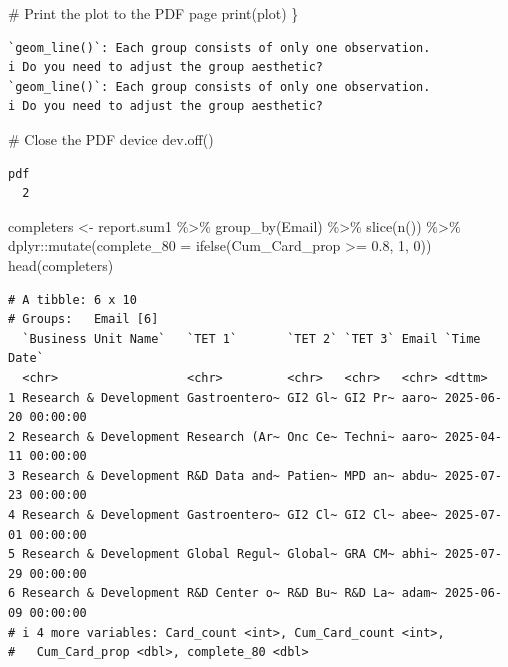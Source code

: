 \documentclass[
  letterpaper,
  DIV=11,
  numbers=noendperiod]{scrartcl}
\newenvironment{Shaded}{\begin{snugshade}}{\end{snugshade}}
\newcommand{\AttributeTok}[1]{\textcolor[rgb]{0.40,0.45,0.13}{#1}}
\newcommand{\CommentTok}[1]{\textcolor[rgb]{0.37,0.37,0.37}{#1}}
\newcommand{\DecValTok}[1]{\textcolor[rgb]{0.68,0.00,0.00}{#1}}
\newcommand{\FloatTok}[1]{\textcolor[rgb]{0.68,0.00,0.00}{#1}}
\newcommand{\FunctionTok}[1]{\textcolor[rgb]{0.28,0.35,0.67}{#1}}
\newcommand{\NormalTok}[1]{\textcolor[rgb]{0.00,0.23,0.31}{#1}}
\newcommand{\OtherTok}[1]{\textcolor[rgb]{0.00,0.23,0.31}{#1}}
\newcommand{\SpecialCharTok}[1]{\textcolor[rgb]{0.37,0.37,0.37}{#1}}
\begin{document}
\begin{Shaded}
\begin{Highlighting}[]
  \CommentTok{\# Print the plot to the PDF page}
  \FunctionTok{print}\NormalTok{(plot)}
\NormalTok{\}}
\end{Highlighting}
\end{Shaded}

\begin{verbatim}
`geom_line()`: Each group consists of only one observation.
i Do you need to adjust the group aesthetic?
`geom_line()`: Each group consists of only one observation.
i Do you need to adjust the group aesthetic?
\end{verbatim}

\begin{Shaded}
\begin{Highlighting}[]
\CommentTok{\# Close the PDF device}
\FunctionTok{dev.off}\NormalTok{()}
\end{Highlighting}
\end{Shaded}

\begin{verbatim}
pdf 
  2 
\end{verbatim}

\begin{Shaded}
\begin{Highlighting}[]
\NormalTok{completers }\OtherTok{\textless{}{-}}\NormalTok{ report.sum1 }\SpecialCharTok{\%\textgreater{}\%} \FunctionTok{group\_by}\NormalTok{(Email) }\SpecialCharTok{\%\textgreater{}\%} 
  \FunctionTok{slice}\NormalTok{(}\FunctionTok{n}\NormalTok{()) }\SpecialCharTok{\%\textgreater{}\%}
\NormalTok{  dplyr}\SpecialCharTok{::}\FunctionTok{mutate}\NormalTok{(}\AttributeTok{complete\_80 =} \FunctionTok{ifelse}\NormalTok{(Cum\_Card\_prop }\SpecialCharTok{\textgreater{}=} \FloatTok{0.8}\NormalTok{, }\DecValTok{1}\NormalTok{, }\DecValTok{0}\NormalTok{)) }
\FunctionTok{head}\NormalTok{(completers)}
\end{Highlighting}
\end{Shaded}

\begin{verbatim}
# A tibble: 6 x 10
# Groups:   Email [6]
  `Business Unit Name`   `TET 1`       `TET 2` `TET 3` Email `Time Date`        
  <chr>                  <chr>         <chr>   <chr>   <chr> <dttm>             
1 Research & Development Gastroentero~ GI2 Gl~ GI2 Pr~ aaro~ 2025-06-20 00:00:00
2 Research & Development Research (Ar~ Onc Ce~ Techni~ aaro~ 2025-04-11 00:00:00
3 Research & Development R&D Data and~ Patien~ MPD an~ abdu~ 2025-07-23 00:00:00
4 Research & Development Gastroentero~ GI2 Cl~ GI2 Cl~ abee~ 2025-07-01 00:00:00
5 Research & Development Global Regul~ Global~ GRA CM~ abhi~ 2025-07-29 00:00:00
6 Research & Development R&D Center o~ R&D Bu~ R&D La~ adam~ 2025-06-09 00:00:00
# i 4 more variables: Card_count <int>, Cum_Card_count <int>,
#   Cum_Card_prop <dbl>, complete_80 <dbl>
\end{verbatim}
\end{document}
